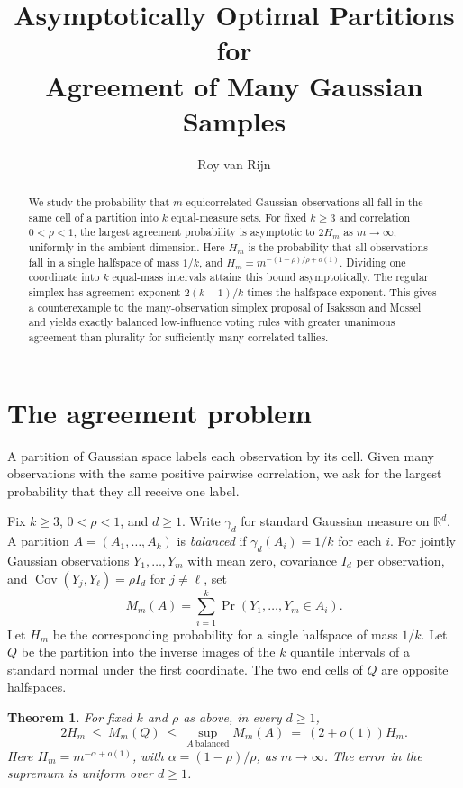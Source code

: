 \documentclass[11pt,reqno]{amsart}
\title[Agreement of many Gaussian samples]{Asymptotically Optimal Partitions for\\Agreement of Many Gaussian Samples}
\author{Roy van Rijn}
\date{}
\newtheorem{theorem}{Theorem}
\newcommand{\R}{\mathbb R}
\newcommand{\ga}{\gamma}
\begin{document}
\begin{abstract}
We study the probability that $m$ equicorrelated Gaussian observations
all fall in the same cell of a partition into $k$ equal-measure sets.
For fixed $k\ge3$ and correlation $0<\rho<1$, the largest agreement
probability is asymptotic to $2H_m$ as $m\to\infty$, uniformly in the
ambient dimension. Here $H_m$ is the probability that all observations
fall in a single halfspace of mass $1/k$, and
$H_m=m^{-(1-\rho)/\rho+o(1)}$. Dividing one coordinate into $k$ equal-mass
intervals attains this bound asymptotically. The regular simplex has
agreement exponent $2(k-1)/k$ times the halfspace exponent. This gives
a counterexample to the many-observation simplex proposal of
Isaksson and Mossel and yields exactly balanced low-influence voting
rules with greater unanimous agreement than plurality for sufficiently
many correlated tallies.
\end{abstract}
\maketitle

\section{The agreement problem}

A partition of Gaussian space labels each observation by its cell.
Given many observations with the same positive pairwise correlation,
we ask for the largest probability that they all receive one label.

Fix $k\ge3$, $0<\rho<1$, and $d\ge1$. Write $\ga_d$ for standard Gaussian
measure on $\R^d$. A partition $A=(A_1,\ldots,A_k)$ is \emph{balanced}
if $\ga_d(A_i)=1/k$ for each $i$. For jointly Gaussian observations
$Y_1,\ldots,Y_m$ with mean zero, covariance $I_d$ per observation, and
$\operatorname{Cov}(Y_j,Y_\ell)=\rho I_d$ for $j\ne\ell$, set
\[
 M_m(A)=\sum_{i=1}^k\Pr(Y_1,\ldots,Y_m\in A_i).
\]
Let $H_m$ be the corresponding probability for a single halfspace of
mass $1/k$. Let $Q$ be the partition into the inverse images of the $k$
quantile intervals of a standard normal under the first coordinate.
The two end cells of $Q$ are opposite halfspaces.

\begin{theorem}\label{thm:agreement}
For fixed $k$ and $\rho$ as above, in every $d\ge1$,
\[
 2H_m\ \le\ M_m(Q)\ \le\ \sup_{A\ \mathrm{balanced}} M_m(A)
       \ =\ (2+o(1))H_m.
\]
Here $H_m=m^{-\alpha+o(1)}$, with $\alpha=(1-\rho)/\rho$, as $m\to\infty$.
The error in the supremum is uniform over $d\ge1$.
\end{theorem}
\end{document}
